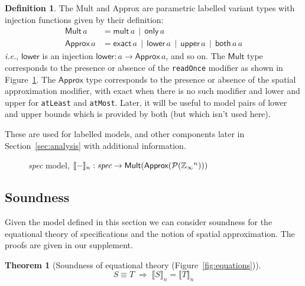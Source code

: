 \documentclass[9pt]{sigplanconf}
\newcounter{block}
\theoremstyle{definition}
\newtheorem{theorem}[block]{Theorem}
\newtheorem{definition}[block]{Definition}
\newcommand{\ie}{\emph{i.e.}}
\newcommand{\interp}[1]{\llbracket{#1}\rrbracket}
\newcommand{\term}[1]{\texttt{#1}}
\begin{document}
\begin{definition} The \textsf{Mult}
and \textsf{Approx} are parametric labelled variant types 
with injection functions given by their definition:
%
\begin{align*}
\textsf{Mult} \, a & = \textsf{mult} \, a \,\mid\, \textsf{only} \, a \\
\textsf{Approx} \, a & = \textsf{exact} \, a \,\mid\, \textsf{lower} \, a \,\mid\,
\textsf{upper} \, a \,\mid\, \textsf{both} \, a \, a
\end{align*}
\ie{}, $\mathsf{lower}$ is an injection $\mathsf{lower} : a \rightarrow \mathsf{Approx} \, a$, and so
on. The $\textsf{Mult}$ type corresponds to the presence or absence of the
\term{readOnce} modifier as shown in Figure~\ref{fig:spatial-model}. 
The $\textsf{Approx}$ type corresponds to the presence or absence of
the spatial approximation modifier, with \textsf{exact} when there is
no such modifier and \textsf{lower} and \textsf{upper} for
\term{atLeast} and \term{atMost}. Later, it will be useful to model
pairs of lower and upper bounds which is provided by \textsf{both} 
(but which isn't used here). 

These are used for labelled models, and other components later in
Section~\ref{sec:analysis} with additional information.
\label{def:mult-and-approx}
\end{definition}
%

\begin{figure}[t]

\caption{\textit{spec} model, 
$\interp{-}_n : \textit{spec} \rightarrow \textsf{Mult}(\textsf{Approx}(\mathcal{P}(\domainVal{}^n)))$}
\label{fig:spatial-model}
\vspace{-1em}
\end{figure}

\subsection{Soundness}

Given the model defined in this section we can
consider soundness for the equational theory of
specifications and the notion of spatial approximation. The proofs are given in our supplement.

\begin{theorem}[Soundness of equational theory (Figure~\ref{fig:equations})]
\[
S \equiv T \; \Rightarrow \;
\interp{S}_n = \interp{T}_n
\]
\end{theorem}
\end{document}

